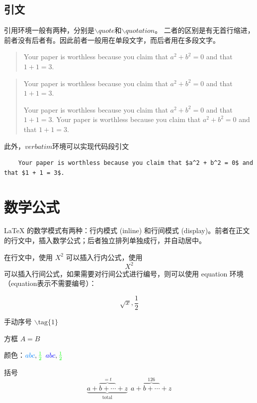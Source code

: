 \subsection{引文}
引用环境一般有两种，分别是$\backslash quote$和$\backslash quotation$。
二者的区别是有无首行缩进，前者没有后者有。因此前者一般用在单段文字，而后者用在多段文字。

\begin{quote}
    Your paper is worthless because you claim that $a^2 + b^2 = 0$ and that $1 + 1 = 3$.
\end{quote}

\begin{quotation}
    Your paper is worthless because you claim that $a^2 + b^2 = 0$ and that $1 + 1 = 3$.
    
    Your paper is worthless because you claim that $a^2 + b^2 = 0$ and that $1 + 1 = 3$.
    Your paper is worthless because you claim that $a^2 + b^2 = 0$ and that $1 + 1 = 3$.
\end{quotation}

此外，$verbatim$环境可以实现代码段引文
\begin{verbatim}
    Your paper is worthless because you claim that $a^2 + b^2 = 0$ and that $1 + 1 = 3$.
\end{verbatim}

\section{数学公式}

LaTeX 的数学模式有两种：行内模式 (inline) 和行间模式 (display)。前者在正文的行文中，插入数学公式；后者独立排列单独成行，并自动居中。

在行文中，使用 $ X^2 $ 可以插入行内公式，使用 \[ X^2 \] 可以插入行间公式，如果需要对行间公式进行编号，则可以使用 equation 环境（equation表示不需要编号）：

\begin{equation}
\sqrt{x}, \frac{1}{2}
\end{equation}

手动序号 $\backslash\text{tag}\{1\}$ 

方框 $\boxed{A} = B$

颜色：$\textcolor[rgb]{0.00,0.50,1.00}{abc}, \color{green}{\frac{1}{2}}$   ${\color{blue}abc}, \color{green}{\frac{1}{2}}$ 

括号
\begin{equation}
    \underbrace{a + \overbrace{b+\cdots}^{{}=t}+z}_{\text{total}}~~ 
    a+{\overbrace{b+\cdots}}^{126}+z
\end{equation}


